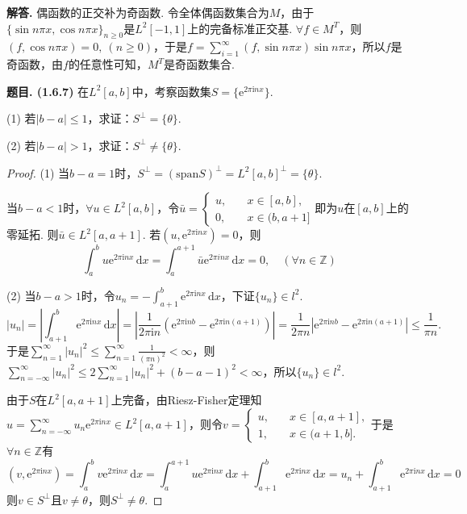 \documentclass[12pt, a4paper, oneside]{ctexart}
\newcounter{problem}  %
\newenvironment{problem}[1][]{\stepcounter{problem}\par\noindent\textbf{题目\arabic{problem}. #1}}{\smallskip\par}
\newenvironment{solution}[1][]{\par\noindent\textbf{#1解答. }}{\smallskip\par}  %
\let\leq=\leqslant %
\let\geq=\geqslant %
\def\Z{\mathbb{Z}}          %
\def\d{\mathrm{d}}          %
\def\e{\mathrm{e}}          %
\def\i{\mathrm{i}}          %
\begin{document}
\begin{solution}
    偶函数的正交补为奇函数. 令全体偶函数集合为$M$，由于$\{\sin n\pi x,\cos n\pi x\}_{n\geq 0}$是$L^2[-1,1]$上的完备标准正交基. $\forall f \in M^T$，则$(f,\cos n\pi x) = 0,\ (n\geq 0)$，于是$f= \sum_{i=1}^\infty (f, \sin n\pi x)\sin n\pi x$，所以$f$是奇函数，由$f$的任意性可知，$M^T$是奇函数集合.
\end{solution}
\begin{problem}[(1.6.7)]
    在$L^2[a,b]$中，考察函数集$S = \{\e^{2\pi \i nx}\}$.

    (1) 若$|b-a|\leq 1$，求证：$S^\perp = \{\theta\}$.

    (2) 若$|b-a| > 1$，求证：$S^\perp\neq \{\theta\}$.
\end{problem}
\begin{proof}
    (1) 当$b-a=1$时，$S^\perp = (\text{span}S)^\perp = L^2[a,b]^\perp = \{\theta\}$.

    当$b-a < 1$时，$\forall u\in L^2[a,b]$，令$\bar{u} = \begin{cases}
        u,&\quad x\in [a,b],\\ 0,&\quad x\in (b,a+1]
    \end{cases}$即为$u$在$[a,b]$上的零延拓. 则$\bar{u}\in L^2[a,a+1]$. 若$(u, \e^{2\pi \i nx}) = 0$，则
    \begin{equation*}
        \int_a^bu\e^{2\pi\i nx}\,\d x = \int_a^{a+1}\bar{u}\e^{2\pi inx}\,\d x = 0,\quad(\forall n\in \Z)
    \end{equation*}

    (2) 当$b-a > 1$时，令$u_n = -\int_{a+1}^b\e^{2\pi\i nx}\,\d x$，下证$\{u_n\}\in l^2$. 
    \begin{equation*}
        |u_n| = \left|\int_{a+1}^b\e^{2\pi\i nx}\,\d x\right|=\left|\frac{1}{2\pi\i n}\left(\e^{2\pi\i nb}-\e^{2\pi\i n(a+1)}\right)\right| = \frac{1}{2\pi n}\left|\e^{2\pi\i nb}-\e^{2\pi\i n(a+1)}\right|\leq \frac{1}{\pi n}.
    \end{equation*}
    于是$\sum_{n=1}^\infty |u_n|^2\leq \sum_{n=1}^\infty \frac{1}{(\pi n)^2} < \infty$，则$\sum_{n=-\infty}^\infty |u_n|^2\leq 2\sum_{n=1}^\infty |u_n|^2 + (b-a-1)^2 < \infty$，所以$\{u_n\}\in l^2$.
    
    由于$S$在$L^2[a,a+1]$上完备，由Riesz-Fisher定理知$u = \sum_{n=-\infty}^\infty u_n\e^{2\pi \i nx}\in L^2[a,a+1]$，则令$v = \begin{cases}
        u,&\quad x\in [a,a+1],\\
        1,&\quad x\in (a+1,b].
    \end{cases}$于是$\forall n\in \Z$有
    \begin{equation*}
        (v, \e^{2\pi \i nx}) = \int_a^bv\e^{2\pi\i nx}\,\d x = \int_a^{a+1}u\e^{2\pi \i nx}\,\d x + \int_{a+1}^b\e^{2\pi \i nx}\,\d x = u_n + \int_{a+1}^b \e^{2\pi\i n x}\,\d x= 0
    \end{equation*}
    则$v\in S^{\perp}$且$v\neq \theta$，则$S^\perp\neq {\theta}$.
\end{proof}
\end{document}
